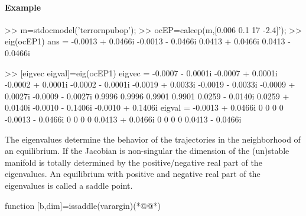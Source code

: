 \paragraph{Example}
\begin{matlab}
>> m=stdocmodel('terrornpubop');
>> ocEP=calcep(m,[0.006 0.1 17 -2.4]');
>> eig(ocEP{1})
ans =
  -0.0013 + 0.0466i
  -0.0013 - 0.0466i
   0.0413 + 0.0466i
   0.0413 - 0.0466i
	
>> [eigvec eigval]=eig(ocEP{1})
eigvec =
  -0.0007 - 0.0001i  -0.0007 + 0.0001i  -0.0002 + 0.0001i  -0.0002 - 0.0001i
  -0.0019 + 0.0033i  -0.0019 - 0.0033i  -0.0009 + 0.0027i  -0.0009 - 0.0027i
   0.9996             0.9996             0.9901             0.9901          
   0.0259 - 0.0140i   0.0259 + 0.0140i  -0.0010 - 0.1406i  -0.0010 + 0.1406i
eigval =
  -0.0013 + 0.0466i        0                  0                  0          
        0            -0.0013 - 0.0466i        0                  0          
        0                  0             0.0413 + 0.0466i        0          
        0                  0                  0             0.0413 - 0.0466i
\end{matlab}
The eigenvalues determine the behavior of the trajectories in the neighborhood of an equilibrium. If the Jacobian is non-singular the dimension of the (un)stable manifold is totally determined by the positive/negative real part of the eigenvalues. An equilibrium with positive and negative real part of the eigenvalues is called a saddle point.
\begin{matlab}
function [b,dim]=issaddle(varargin)(*@@*)
%
%
%
%
%
%
\end{matlab}
